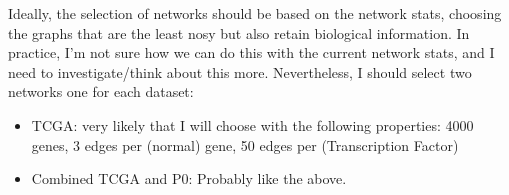 Ideally, the selection of networks should be based on the network stats, choosing the graphs that are the least nosy but also retain biological information. In practice, I'm not sure how we can do this with the current network stats, and I need to investigate/think about this more. Nevertheless, I should select two networks one for each dataset:
\begin{itemize}
    \item TCGA: very likely that I will choose with the following properties: 4000 genes, 3 edges per (normal) gene, 50 edges per (Transcription Factor)
    \item Combined TCGA and P0: Probably like the above.
\end{itemize}